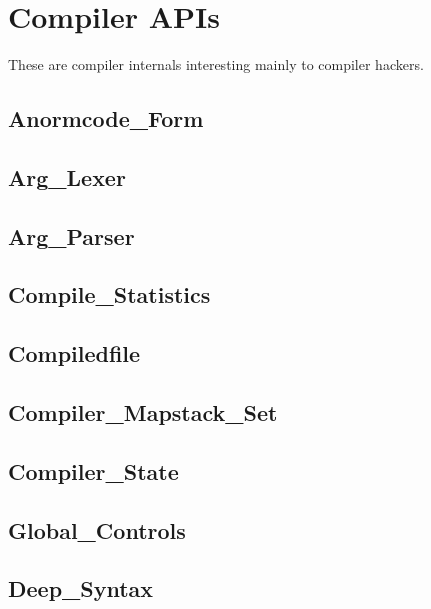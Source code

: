 \section{Compiler APIs}

%
%

These are compiler internals interesting mainly to 
compiler hackers.


\subsection{Anormcode\_Form}				
\subsection{Arg\_Lexer}					
\subsection{Arg\_Parser}				
\subsection{Compile\_Statistics}			
\subsection{Compiledfile}				
\subsection{Compiler\_Mapstack\_Set}			
\subsection{Compiler\_State}				
\subsection{Global\_Controls}				
\subsection{Deep\_Syntax}				

